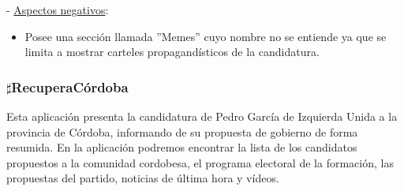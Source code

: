  - \underline{Aspectos negativos}:

\begin{itemize}
	\item Posee una sección llamada ''Memes'' cuyo nombre no se entiende ya que se limita a mostrar carteles propagandísticos de la candidatura. 
\end{itemize}

\subsubsection{$\sharp$RecuperaCórdoba}
Esta aplicación \cite{ref:recpCordoba}  presenta la candidatura de Pedro García de Izquierda Unida a la provincia de Córdoba, informando de su propuesta de gobierno de forma resumida. En la aplicación podremos encontrar la lista de los candidatos propuestos a la comunidad cordobesa, el programa electoral de la formación, las propuestas del partido, noticias de última hora y vídeos.

